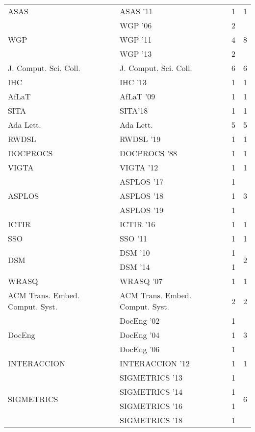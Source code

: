 \begin{table*}[t]
\begin{tabular}{llrr}
\multirow{1}{*}{ASAS } & ASAS '11 & 1 & \multirow{1}{*}{1}\\
\multirow{3}{*}{WGP } & WGP '06 & 2 & \multirow{3}{*}{8}\\
& WGP '11 & 4 &\\
& WGP '13 & 2 &\\
\multirow{1}{*}{J. Comput. Sci. Coll.} & J. Comput. Sci. Coll. & 6 & \multirow{1}{*}{6}\\
\multirow{1}{*}{IHC } & IHC '13 & 1 & \multirow{1}{*}{1}\\
\multirow{1}{*}{AfLaT } & AfLaT '09 & 1 & \multirow{1}{*}{1}\\
\multirow{1}{*}{SITA} & SITA'18 & 1 & \multirow{1}{*}{1}\\
\multirow{1}{*}{Ada Lett.} & Ada Lett. & 5 & \multirow{1}{*}{5}\\
\multirow{1}{*}{RWDSL } & RWDSL '19 & 1 & \multirow{1}{*}{1}\\
\multirow{1}{*}{DOCPROCS } & DOCPROCS '88 & 1 & \multirow{1}{*}{1}\\
\multirow{1}{*}{VIGTA } & VIGTA '12 & 1 & \multirow{1}{*}{1}\\
\multirow{3}{*}{ASPLOS } & ASPLOS '17 & 1 & \multirow{3}{*}{3}\\
& ASPLOS '18 & 1 &\\
& ASPLOS '19 & 1 &\\
\multirow{1}{*}{ICTIR } & ICTIR '16 & 1 & \multirow{1}{*}{1}\\
\multirow{1}{*}{SSO } & SSO '11 & 1 & \multirow{1}{*}{1}\\
\multirow{2}{*}{DSM } & DSM '10 & 1 & \multirow{2}{*}{2}\\
& DSM '14 & 1 &\\
\multirow{1}{*}{WRASQ } & WRASQ '07 & 1 & \multirow{1}{*}{1}\\
\multirow{1}{*}{ACM Trans. Embed. Comput. Syst.} & ACM Trans. Embed. Comput. Syst. & 2 & \multirow{1}{*}{2}\\
\multirow{3}{*}{DocEng } & DocEng '02 & 1 & \multirow{3}{*}{3}\\
& DocEng '04 & 1 &\\
& DocEng '06 & 1 &\\
\multirow{1}{*}{INTERACCION } & INTERACCION '12 & 1 & \multirow{1}{*}{1}\\
\multirow{6}{*}{SIGMETRICS } & SIGMETRICS '13 & 1 & \multirow{6}{*}{6}\\
& SIGMETRICS '14 & 1 &\\
& SIGMETRICS '16 & 1 &\\
& SIGMETRICS '18 & 1 &\\

\end{tabular}
\end{table*}
